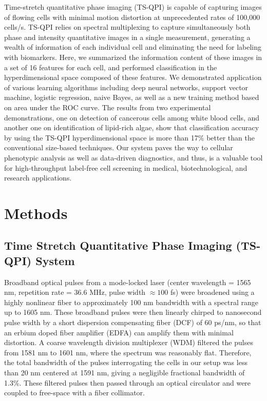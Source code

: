 \documentclass[aps,pra,reprint,superscriptaddress]{revtex4-1}
\begin{document}
Time-stretch quantitative phase imaging (TS-QPI) is capable of capturing images of flowing cells with minimal motion distortion at unprecedented rates of 100,000 cells/s. TS-QPI relies on spectral multiplexing to capture simultaneously both phase and intensity quantitative images in a single measurement, generating a wealth of information of each individual cell and eliminating the need for labeling with biomarkers. Here, we summarized the information content of these images in a set of 16 features for each cell, and performed classification in the hyperdimensional space composed of these features. We demonstrated application of various learning algorithms including deep neural networks, support vector machine, logistic regression, naive Bayes, as well as a new training method based on area under the ROC curve. The results from two experimental demonstrations, one on detection of cancerous cells among white blood cells, and another one on identification of lipid-rich algae, show that classification accuracy by using the TS-QPI hyperdimensional space is more than 17\% better than the conventional size-based techniques. Our system paves the way to cellular phenotypic analysis as well as data-driven diagnostics, and thus, is a valuable tool for high-throughput label-free cell screening in medical, biotechnological, and research applications.

\section*{\label{scn:Methods} Methods}

\subsection*{Time Stretch Quantitative Phase Imaging (TS-QPI) System}

Broadband optical pulses from a mode-locked laser (center wavelength = 1565 nm, repetition rate = 36.6 MHz, pulse width $\approx100$ fs) were broadened using a highly nonlinear fiber to approximately 100 nm bandwidth with a spectral range up to 1605 nm. These broadband pulses were then linearly chirped to nanosecond pulse width by a short dispersion compensating fiber (DCF) of 60 ps/nm, so that an erbium doped fiber amplifier (EDFA) can amplify them with minimal distortion. A coarse wavelength division multiplexer (WDM) filtered the pulses from 1581 nm to 1601 nm, where the spectrum was reasonably flat. Therefore, the total bandwidth of the pulses interrogating the cells in our setup was less than 20 nm centered at 1591 nm, giving a negligible fractional bandwidth of 1.3\%. These filtered pulses then passed through an optical circulator and were coupled to free-space with a fiber collimator.
\end{document}
